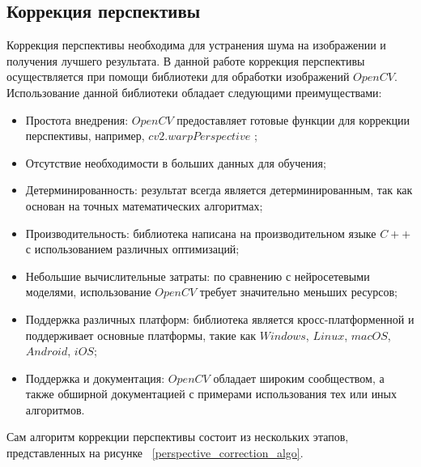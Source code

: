 \subsection{Коррекция перспективы}

Коррекция перспективы необходима для устранения шума на изображении и получения лучшего результата. 
В данной работе коррекция перспективы осуществляется при помощи библиотеки для обработки изображений $OpenCV$. Использование данной библиотеки обладает следующими преимуществами:
\begin{itemize}
    \item Простота внедрения: $OpenCV$ предоставляет готовые функции для коррекции перспективы, например, $cv2.warpPerspective$ \cite{opencv_perspective_transform};
    \item Отсутствие необходимости в больших данных для обучения;
    \item Детерминированность: результат всегда является детерминированным, так как основан на точных математических алгоритмах;
    \item Производительность: библиотека написана на производительном языке $C++\;$ с использованием различных оптимизаций;
    \item Небольшие вычислительные затраты: по сравнению с нейросетевыми моделями, использование $OpenCV$ требует значительно меньших ресурсов;
    \item Поддержка различных платформ: библиотека является кросс-платформенной и поддерживает основные платформы, такие как $Windows$, $Linux$, $macOS$, $Android$, $iOS$;
    \item Поддержка и документация: $OpenCV$ обладает широким сообществом, а также обширной документацией с примерами использования тех или иных алгоритмов.
\end{itemize}

Сам алгоритм коррекции перспективы состоит из нескольких этапов, представленных на рисунке ~\ref{perspective_correction_algo}. 

